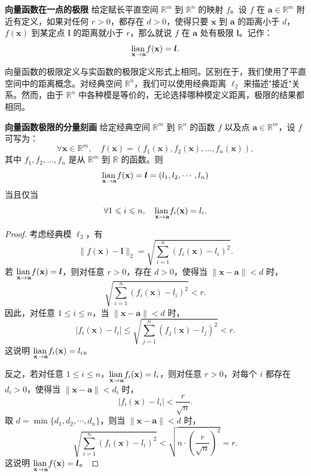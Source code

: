 \documentclass[12pt,UTF8,fontset=none]{ctexbook}
\begin{document}
\begin{df}{\textbf{向量函数在一点的极限}}
给定赋长平直空间 $\mathbb{R}^m$ 到 $\mathbb{R}^n$ 的映射 $f$。设 $f$ 在 $\mathbf{a}\in\mathbb{R}^m$ 附近有定义，如果对任何 $r>0$，都存在 $d>0$，使得只要 $\mathbf{x}$ 到 $\mathbf{a}$ 的距离小于 $d$，$f(\mathbf{x})$ 到某定点 $\boldsymbol{l}$ 的距离就小于 $r$，那么就说 $f$ 在 $\mathbf{a}$ 处有极限 $\boldsymbol{l}$。记作：
$$ \underset{\mathbf{x}\to \mathbf{a}}{\operatorname{lian}\,} f(\mathbf{x}) = \boldsymbol{l}. $$
\end{df}

向量函数的极限定义与实函数的极限定义形式上相同。区别在于，我们使用了平直空间中的距离概念。对经典空间 $\mathbb{R}^n$，我们可以使用经典距离 $\ell_2$ 来描述"接近"关系。然而，由于 $\mathbb{R}^n$ 中各种模是等价的，无论选择哪种模定义距离，极限的结果都相同。

\begin{tm}{\textbf{向量函数极限的分量刻画}}
给定经典空间 $\mathbb{R}^m$ 到 $\mathbb{R}^n$ 的函数 $f$ 以及点 $\mathbf{a}\in\mathbb{R}^m$，设 $f$ 可写为：
$$ \forall \mathbf{x} \in \mathbb{R}^m, \quad f(\mathbf{x}) = (f_1(\mathbf{x}), f_2(\mathbf{x}), \ldots, f_n(\mathbf{x})), $$
其中 $f_1, f_2, \ldots, f_n$ 是从 $\mathbb{R}^m$ 到 $\mathbb{R}$ 的函数。则
$$ \underset{\mathbf{x}\to \mathbf{a}}{\operatorname{lian}\,} f(\mathbf{x}) = \boldsymbol{l} = (l_1, l_2, \cdots, l_n) $$
当且仅当
$$ \forall 1 \leqslant i \leqslant n, \quad \underset{\mathbf{x}\to \mathbf{a}}{\operatorname{lian}\,} f_i(\mathbf{x}) = l_i. $$
\end{tm}

\begin{proof}
考虑经典模 $\ell_2$，有
$$ \|f(\mathbf{x}) - \boldsymbol{l}\|_2 = \sqrt{\sum_{i=1}^n (f_i(\mathbf{x}) - l_i)^2}. $$
若 $\underset{\mathbf{x}\to \mathbf{a}}{\operatorname{lian}\,} f(\mathbf{x}) = \boldsymbol{l}$，则对任意 $r>0$，存在 $d>0$，使得当 $\|\mathbf{x}-\mathbf{a}\|<d$ 时，
$$ \sqrt{\sum_{i=1}^n (f_i(\mathbf{x}) - l_i)^2} < r. $$
因此，对任意 $1 \leqslant i \leqslant n$，当 $\|\mathbf{x}-\mathbf{a}\|<d$ 时，
$$ |f_i(\mathbf{x}) - l_i| \leqslant \sqrt{\sum_{j=1}^n (f_j(\mathbf{x}) - l_j)^2} < r. $$
这说明 $\underset{\mathbf{x}\to \mathbf{a}}{\operatorname{lian}\,} f_i(\mathbf{x}) = l_i$。

反之，若对任意 $1 \leqslant i \leqslant n$，$\underset{\mathbf{x}\to \mathbf{a}}{\operatorname{lian}\,} f_i(\mathbf{x}) = l_i$，则对任意 $r>0$，对每个 $i$ 都存在 $d_i>0$，使得当 $\|\mathbf{x}-\mathbf{a}\|<d_i$ 时，
$$ |f_i(\mathbf{x}) - l_i| < \frac{r}{\sqrt{n}}. $$
取 $d = \min\{d_1, d_2, \cdots, d_n\}$，则当 $\|\mathbf{x}-\mathbf{a}\|<d$ 时，
$$ \sqrt{\sum_{i=1}^n (f_i(\mathbf{x}) - l_i)^2} < \sqrt{n \cdot \left(\frac{r}{\sqrt{n}}\right)^2} = r. $$
这说明 $\underset{\mathbf{x}\to \mathbf{a}}{\operatorname{lian}\,} f(\mathbf{x}) = \boldsymbol{l}$。
\end{proof}
\end{document}
